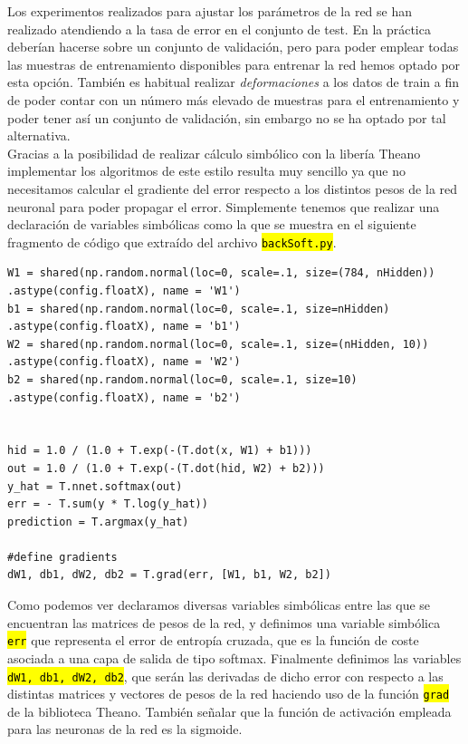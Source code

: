 \documentclass[10pt,a4paper]{article}
\newcommand{\code}[1]{\sethlcolor{light-gray}\hl{\texttt{#1}}} %
\newcommand{\archive}[1]{\sethlcolor{light-green}\hl{\texttt{#1}}} %
\begin{document}
Los experimentos realizados para ajustar los parámetros de la red se han realizado atendiendo a la tasa de error en el conjunto de test. En la práctica deberían hacerse sobre un conjunto de validación, pero para poder emplear todas las muestras de entrenamiento disponibles para entrenar la red hemos optado por esta opción. También es habitual realizar \textit{deformaciones} a los datos de train a fin de poder contar con un número más elevado de muestras para el entrenamiento y poder tener así un conjunto de validación, sin embargo no se ha optado por tal alternativa.\\

Gracias a la posibilidad de realizar cálculo simbólico con la libería Theano implementar los algoritmos de este estilo resulta muy sencillo ya que no necesitamos calcular el gradiente del error respecto a los distintos pesos de la red neuronal para poder propagar el error. Simplemente tenemos que realizar una declaración de variables simbólicas como la que se muestra en el siguiente fragmento de código que extraído del archivo \archive{backSoft.py}.

\begin{lstlisting}
W1 = shared(np.random.normal(loc=0, scale=.1, size=(784, nHidden))
.astype(config.floatX), name = 'W1')
b1 = shared(np.random.normal(loc=0, scale=.1, size=nHidden)
.astype(config.floatX), name = 'b1')
W2 = shared(np.random.normal(loc=0, scale=.1, size=(nHidden, 10))
.astype(config.floatX), name = 'W2')
b2 = shared(np.random.normal(loc=0, scale=.1, size=10)
.astype(config.floatX), name = 'b2')


hid = 1.0 / (1.0 + T.exp(-(T.dot(x, W1) + b1)))
out = 1.0 / (1.0 + T.exp(-(T.dot(hid, W2) + b2)))
y_hat = T.nnet.softmax(out)
err = - T.sum(y * T.log(y_hat))
prediction = T.argmax(y_hat)

#define gradients
dW1, db1, dW2, db2 = T.grad(err, [W1, b1, W2, b2])
\end{lstlisting}

Como podemos ver declaramos diversas variables simbólicas entre las que se encuentran las matrices de pesos de la red, y definimos una variable simbólica \code{err} que representa el error de entropía cruzada, que es la función de coste asociada a una capa de salida de tipo softmax. Finalmente definimos las variables \code{dW1, db1, dW2, db2}, que serán las derivadas de dicho error con respecto a las distintas matrices y vectores de pesos de la red haciendo uso de la función \code{grad} de la biblioteca Theano. También señalar que la función de activación empleada para las neuronas de la red es la sigmoide.\\
\end{document}
